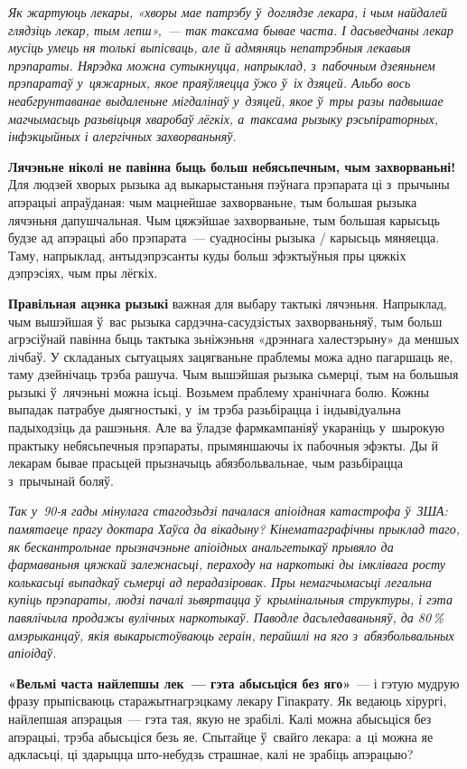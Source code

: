 \emph{Як жартуюць лекары, «хворы мае патрэбу ў~доглядзе лекара, і чым найдалей глядзіць лекар, тым лепш»,~--- так таксама бывае часта. І дасьведчаны лекар мусіць умець ня толькі выпісваць, але й адмяняць непатрэбныя лекавыя прэпараты. Нярэдка можна сутыкнуцца, напрыклад, з~пабочным дзеяньнем прэпаратаў у~цяжарных, якое праяўляецца ўжо ў~іх дзяцей. Альбо вось неабгрунтаванае выдаленьне мігдалінаў у~дзяцей, якое ў~тры разы падвышае магчымасьць разьвіцьця хваробаў лёгкіх, а~таксама рызыку рэсьпіраторных, інфэкцыйных і алергічных захворваньняў.}

\textbf{Лячэньне ніколі не павінна быць больш небясьпечным, чым захворваньні!} Для людзей хворых рызыка ад выкарыстаньня пэўнага прэпарата ці з~прычыны апэрацыі апраўданая: чым мацнейшае захворваньне, тым большая рызыка лячэньня дапушчальная. Чым цяжэйшае захворваньне, тым большая карысьць будзе ад апэрацыі або прэпарата~--- суадносіны рызыка / карысьць мяняецца. Таму, напрыклад, антыдэпрэсанты куды больш эфэктыўныя пры цяжкіх дэпрэсіях, чым пры лёгкіх.

\textbf{Правільная ацэнка рызыкі} важная для выбару тактыкі лячэньня. Напрыклад, чым вышэйшая ў~вас рызыка сардэчна-сасудзістых захворваньняў, тым больш агрэсіўнай павінна быць тактыка зьніжэньня «дрэннага халестэрыну» да меншых лічбаў. У складаных сытуацыях зацягваньне праблемы можа адно пагаршаць яе, таму дзейнічаць трэба рашуча. Чым вышэйшая рызыка сьмерці, тым на большыя рызыкі ў~лячэньні можна ісьці. Возьмем праблему хранічнага болю. Кожны выпадак патрабуе дыягностыкі, у~ім трэба разьбірацца і індывідуальна падыходзіць да рашэньня. Але ва ўладзе фармкампаніяў укараніць у~шырокую практыку небясьпечныя прэпараты, прымяншаючы іх пабочныя эфэкты. Ды й лекарам бывае прасьцей прызначыць абязбольвальнае, чым разьбірацца з~прычынай боляў.

\emph{Так у~90-я гады мінулага стагодзьдзі пачалася апіоідная катастрофа ў~ЗША: памятаеце прагу доктара Хаўса да вікадыну? Кінематаграфічны прыклад таго, як бескантрольнае прызначэньне апіоідных анальгетыкаў прывяло да фармаваньня цяжкай залежнасьці, пераходу на наркотыкі ды імклівага росту колькасьці выпадкаў сьмерці ад перадазіровак. Пры немагчымасьці легальна купіць прэпараты, людзі пачалі зьвяртацца ў~крымінальныя структуры, і гэта павялічыла продажы вулічных наркотыкаў. Паводле дасьледаваньняў, да 80\,\% амэрыканцаў, якія выкарыстоўваюць гераін, перайшлі на яго з~абязбольвальных апіоідаў.}

\textbf{«Вельмі часта найлепшы лек~--- гэта абысьціся без яго»}~--- і гэтую мудрую фразу прыпісваюць старажытнагрэцкаму лекару Гіпакрату. Як ведаюць хірургі, найлепшая апэрацыя~--- гэта тая, якую не зрабілі. Калі можна абысьціся без апэрацыі, трэба абысьціся безь яе. Спытайце ў~свайго лекара: а~ці можна яе адкласьці, ці здарыцца што-небудзь страшнае, калі не зрабіць апэрацыю?

